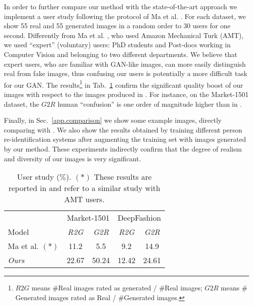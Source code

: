 \documentclass[10pt,twocolumn,letterpaper]{article}
\begin{document}
In order to further compare our method with the state-of-the-art approach \cite{ma2017pose} 
 we implement a user study 
following the protocol of Ma et al. \cite{ma2017pose}. For each dataset, we show
55 real  and 55 generated images in a random order to 30 users for one second.
Differently from Ma et al. \cite{ma2017pose}, who used Amazon Mechanical Turk (AMT),
we used 
 ``expert'' (voluntary) users: PhD students and Post-docs working in Computer Vision and belonging to two different departments.
 We believe that expert users, who are familiar with GAN-like images,
 can more easily 
 distinguish  real  from fake images,  thus confusing our users is potentially a more difficult task for our GAN.
The results\footnote{$R2G$ means $\#$Real images rated as generated / $\#$Real images; 
$G2R$ means $\#$Generated images rated as Real / $\#$Generated images.}  in 
Tab.~\ref{tab:user-study} 
confirm the significant  quality boost of our images with respect to the images produced in
\cite{ma2017pose}. For instance, on the  Market-1501 dataset, the $G2R$ human ``confusion'' is one order of magnitude higher than in \cite{ma2017pose}.

Finally, in Sec.~\ref{app.comparison} we show some example images, directly comparing with \cite{ma2017pose}.  We also show the results obtained 
by training different person re-identification systems  after augmenting the training set with images generated by our  method. These experiments indirectly confirm that the degree of realism and diversity of our images is very significant.


\begin{table}[h!]
\caption{User study ($\%$).
$(*)$ These results are reported in \cite{ma2017pose} and refer to a similar study with AMT users. } 
\centering
\begin{tabular}{l|cc|cc}
  \hline
  &\multicolumn{2}{c|}{Market-1501}&\multicolumn{2}{c}{DeepFashion}\\
 Model &\emph{R2G} & \emph{G2R} & \emph{R2G} & \emph{G2R} \\
\hline
Ma et al. \cite{ma2017pose}   $(*)$        & 11.2       & 5.5        & 9.2       & 14.9 \\
\emph{Ours}             & 22.67     & 50.24  &  12.42   & 24.61 \\
\hline
\end{tabular}
\label{tab:user-study}
\end{table}
\end{document}

